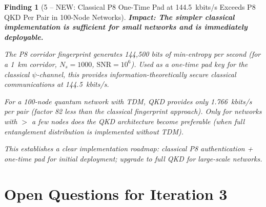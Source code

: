 \documentclass[aps,prd,twocolumn,superscriptaddress,nofootinbib]{revtex4-2}
\newcommand{\SNR}{\mathrm{SNR}}
\newtheorem{finding}{Finding}
\begin{document}
\begin{finding}[5 -- NEW: Classical P8 One-Time Pad at 144.5~kbits/s Exceeds
P8 QKD Per Pair in 100-Node Networks]
\label{find:otp}
\textbf{Impact: The simpler classical implementation is sufficient for
small networks and is immediately deployable.}

The P8 corridor fingerprint generates 144,500 bits of min-entropy per
second (for a 1~km corridor, $N_s = 1000$, $\SNR = 10^6$). Used as a
one-time pad key for the classical $\psi$-channel, this provides
information-theoretically secure classical communications at 144.5~kbits/s.

For a 100-node quantum network with TDM, QKD provides only 1.766~kbits/s
per pair (factor 82 less than the classical fingerprint approach). Only
for networks with $>$ a few nodes does the QKD architecture become
preferable (when full entanglement distribution is implemented without TDM).

This establishes a clear implementation roadmap: classical P8 authentication
+ one-time pad for initial deployment; upgrade to full QKD for large-scale
networks.
\end{finding}

\section{Open Questions for Iteration 3}
\label{sec:open}
\end{document}
